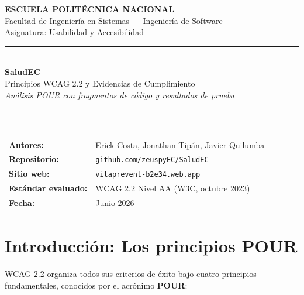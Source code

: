 \documentclass[12pt, a4paper]{article}
\begin{document}
\begin{titlepage}
\centering
\vspace*{2cm}
{\Large\bfseries\color{navydeep} ESCUELA POLITÉCNICA NACIONAL}\\[4pt]
{\normalsize Facultad de Ingeniería en Sistemas --- Ingeniería de Software}\\[4pt]
{\normalsize Asignatura: Usabilidad y Accesibilidad}\\[2cm]
{\color{royalblue}\rule{0.8\linewidth}{1.5pt}}\\[1cm]
{\Huge\bfseries\color{navydeep} SaludEC}\\[0.5cm]
{\Large\color{royalblue} Principios WCAG 2.2 y Evidencias de Cumplimiento}\\[0.3cm]
{\large\itshape Análisis POUR con fragmentos de código y resultados de prueba}\\[1cm]
{\color{royalblue}\rule{0.8\linewidth}{0.8pt}}\\[1.5cm]
\begin{tabular}{ll}
  \textbf{Autores:} & Erick Costa, Jonathan Tipán, Javier Quilumba \\
  \textbf{Repositorio:} & \texttt{github.com/zeuspyEC/SaludEC} \\
  \textbf{Sitio web:} & \texttt{vitaprevent-b2e34.web.app} \\
  \textbf{Estándar evaluado:} & WCAG 2.2 Nivel AA (W3C, octubre 2023) \\
  \textbf{Fecha:} & Junio 2026 \\
\end{tabular}
\end{titlepage}

\tableofcontents
\newpage

\section{Introducción: Los principios POUR}

WCAG 2.2 organiza todos sus criterios de éxito bajo cuatro principios fundamentales, conocidos por el acrónimo \textbf{POUR}:
\end{document}
